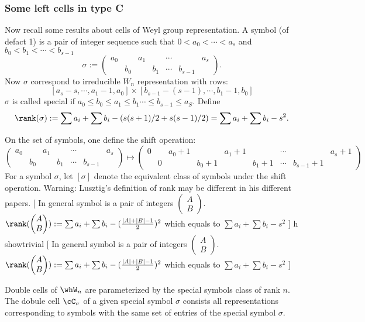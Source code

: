 \documentclass[12pt,a4paper]{amsart}
\newcommand{\trivial}[2][]{\if\relax\detokenize{#1}\relax
  {%
      \color{orange} \vspace{0em} $[$  #2 $]$
      \color{black}
  }
  \else
\ifx#1h
\ifcsname showtrivial\endcsname
{%
    \color{orange} \vspace{0em}  $[$ #2 $]$
    \color{black}
}
\fi
\else {\red Wrong argument!} \fi
\fi
}
\numberwithin{equation}{section}
\theoremstyle{remark}
\begin{document}
  
  \subsubsection{Some left cells in type C}
  Now recall some results about cells of Weyl group representation.  A symbol
  (of defact 1) is a pair of integer sequence such that $0< a_0< \cdots < a_s$
  and $b_0< b_1< \cdots <b_{s-1}$
  \[
    \sigma :=
    \begin{pmatrix}
      a_0 && a_1 && \cdots && a_{s}\\
      & b_0 & & b_1& \cdots & b_{s-1}
    \end{pmatrix}.
  \]
  Now $\sigma$ correspond to irreducible $W_n$ representation with rows:
  \[
    [a_{s}-s,\cdots, a_1-1, a_0]\times [b_{s-1}-(s-1), \cdots, b_1-1, b_0]
  \]
  $\sigma$ is called special if
  $a_0\leq b_0\leq a_1\leq b_1 \cdots \leq b_{s-1}\leq a_{S}$.  Define
  \[\rank(\sigma) := \sum a_i +\sum b_i - (s(s+1)/2+ s(s-1)/2) = \sum a_i
    +\sum b_i - s^2.
  \]

  On the set of symbols, one define the shift operation:
  \[
    \begin{pmatrix}
      a_0 && a_1 && \cdots && a_{s}\\
      & b_0 & & b_1& \cdots & b_{s-1}
    \end{pmatrix}\mapsto
    \begin{pmatrix}
      0&& a_0+1 && a_1+1  && \cdots && a_{s}+1 \\
      &0& & b_0+1 & & b_1+1 & \cdots & b_{s-1}+1
    \end{pmatrix}
  \]
  For a symbol $\sigma$, let $[\sigma]$ denote the equivalent class of symbols
  under the shift operation.  {\color{red} Warning: Lusztig's definition of rank
    may be different in his different papers.  } \trivial{ In general symbol is
    a pair of integers $\begin{pmatrix}A \\ B\end{pmatrix}$.
    $\rank(\begin{pmatrix}A \\ B\end{pmatrix}):= \sum a_i + \sum b_i
    -(\frac{|A|+|B|-1}{2})^2$ which equals to $\sum a_i +\sum b_i -s^2$ }
  
  Double cells of $\whW_n$ are parameterized by the special symbols class of
  rank $n$.  The dobule cell $\cC_\sigma$ of a given special symbol $\sigma$
  consists all representations corresponding to symbols with the same set of
  entries of the special symbol $\sigma$.
  
\end{document}
